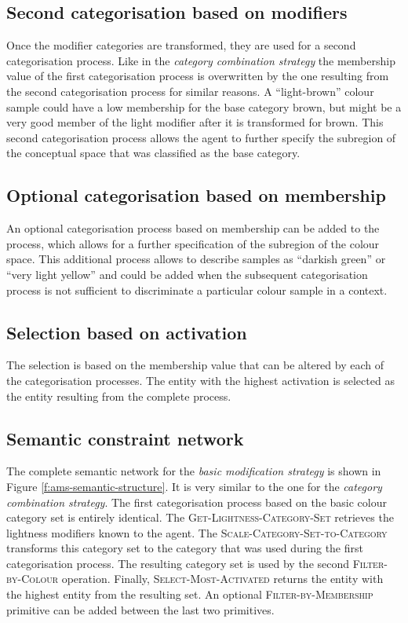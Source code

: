 \subsection{Second categorisation based on modifiers}

Once the modifier categories are transformed, they are used for a
second categorisation process. Like in the \emph{category combination
  strategy} the membership value of the first categorisation process
is overwritten by the one resulting from the second categorisation
process for similar reasons. A ``light-brown'' colour sample could
have a low membership for the base category brown, but might be a very
good member of the light modifier after it is transformed for
brown. This second categorisation process allows the agent to further
specify the subregion of the conceptual space that was classified as
the base category.

\subsection{Optional categorisation based on membership}

An optional categorisation process based on membership can be added to
the process, which allows for a further specification of the subregion
of the colour space. This additional process allows to describe
samples as ``darkish green'' or ``very light yellow'' and could be
added when the subsequent categorisation process is not sufficient to
discriminate a particular colour sample in a context.

\subsection{Selection based on activation}

The selection is based on the membership value that can be altered by
each of the categorisation processes. The entity with the highest
activation is selected as the entity resulting from the complete
process.

\subsection{Semantic constraint network}

The complete semantic network for the \emph{basic modification
  strategy} is shown in Figure \ref{f:ams-semantic-structure}. It is
very similar to the one for the \emph{category combination
  strategy}. The first categorisation process based on the basic
colour category set is entirely identical. The
\textsc{Get-Lightness-Category-Set} retrieves the lightness
modifiers known to the agent. The
\textsc{Scale-Category-Set-to-Category} transforms this category set
to the category that was used during the first categorisation
process. The resulting category set is used by the second
\textsc{Filter-by-Colour} operation. Finally,
\textsc{Select-Most-Activated} returns the entity with the highest
entity from the resulting set. An optional
\textsc{Filter-by-Membership} primitive can be added between the last
two primitives.

